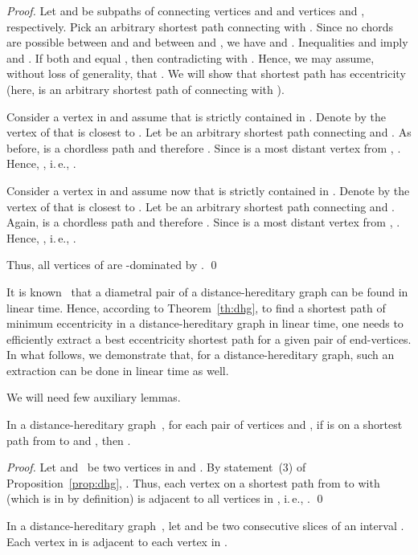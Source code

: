 \documentclass[10pt]{llncs}
\makeatletter
\newcommand{\ie}{i.\,e.\@ifnextchar{,}{}{~}}
\makeatother
\begin{document}
\begin{proof}
Let  and  be subpaths of  connecting vertices  and  and vertices  and , respectively. 
Pick an arbitrary shortest path  connecting  with . 
Since no chords are possible between  and  and between  and , we have
 and .
Inequalities  and  imply  and . 
If both  and  equal , then  contradicting with . 
Hence, we may assume, without loss of generality, that . 
We will show that shortest path  has eccentricity  (here,  is an arbitrary shortest path of  connecting  with ). 

Consider a vertex  in  and assume that  is strictly contained in . 
Denote by  the vertex of  that is closest to . 
Let  be an arbitrary shortest path connecting  and . 
As before,  is a chordless path and therefore .
Since  is a most distant vertex from , . 
Hence, , \ie, . 

Consider a vertex  in  and assume now that  is strictly contained in . 
Denote by  the vertex of  that is closest to . 
Let  be an arbitrary shortest path connecting  and . 
Again,  is a chordless path and therefore .
Since  is a most distant vertex from , . 
Hence, , \ie, . 

Thus, all vertices of  are -dominated by . 
\qed
\end{proof}

It is known~\cite{DrNi} that a diametral pair of a distance-hereditary graph can be found in linear time. 
Hence, according to Theorem~\ref{th:dhg}, to find a shortest path of minimum eccentricity in a distance-hereditary graph in linear time, one needs to efficiently extract a best eccentricity shortest path for a given pair of end-vertices. 
In what follows, we demonstrate that, for a distance-hereditary graph, such an extraction can be done in linear time as well. 

We will need few auxiliary lemmas. 

\begin{lemma}
    \label{lem:dhgGateVertex}
In a distance-hereditary graph~, for each pair of vertices  and , if  is on a shortest path from  to  and , then .
\end{lemma}

\begin{proof}
Let  and~ be two vertices in  and .
By statement~(3) of Proposition~\ref{prop:dhg}, . 
Thus, each vertex  on a shortest path from  to  with  (which is in  by definition) is adjacent to all vertices in , \ie, .
\qed
\end{proof}

\begin{lemma}
    \label{lem:dhgSliceJoin}
In a distance-hereditary graph~, let  and  be two consecutive slices of an interval . 
Each vertex in  is adjacent to each vertex in .
\end{lemma}
\end{document}

